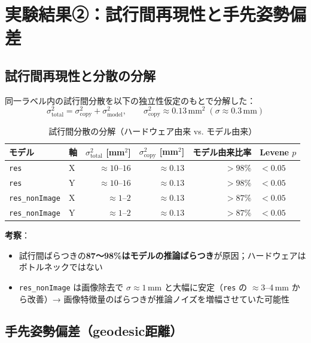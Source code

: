 \documentclass[a4paper,10pt]{jlreq}
\begin{document}
\section{実験結果②：試行間再現性と手先姿勢偏差}

\subsection{試行間再現性と分散の分解}

同一ラベル内の試行間分散を以下の独立性仮定のもとで分解した：
\[
  \sigma^2_\mathrm{total} = \sigma^2_\mathrm{copy} + \sigma^2_\mathrm{model},
  \qquad \sigma^2_\mathrm{copy} \approx 0.13\,\mathrm{mm}^2 \;(\sigma\approx0.3\,\mathrm{mm})
\]

\begin{table}[h]
  \centering\small
  \caption{試行間分散の分解（ハードウェア由来 vs. モデル由来）}
  \begin{tabular}{llrrrl}
    \toprule
    モデル & 軸 & $\sigma^2_\mathrm{total}$ [mm$^2$] & $\sigma^2_\mathrm{copy}$ [mm$^2$] & モデル由来比率 & Levene $p$ \\
    \midrule
    \texttt{res}          & X & $\approx 10$--$16$ & $\approx 0.13$ & $> 98\%$ & $<0.05$ \\
    \texttt{res}          & Y & $\approx 10$--$16$ & $\approx 0.13$ & $> 98\%$ & $<0.05$ \\
    \texttt{res\_nonImage}& X & $\approx 1$--$2$   & $\approx 0.13$ & $> 87\%$ & $<0.05$ \\
    \texttt{res\_nonImage}& Y & $\approx 1$--$2$   & $\approx 0.13$ & $> 87\%$ & $<0.05$ \\
    \bottomrule
  \end{tabular}
\end{table}

\textbf{考察}：
\begin{itemize}
  \item 試行間ばらつきの\textbf{87〜98\%はモデルの推論ばらつき}が原因；ハードウェアはボトルネックではない
  \item \texttt{res\_nonImage} は画像除去で $\sigma\approx1$\,mm と大幅に安定（\texttt{res} の $\approx3$--4\,mm から改善）→ 画像特徴量のばらつきが推論ノイズを増幅させていた可能性
\end{itemize}

\subsection{手先姿勢偏差（geodesic距離）}
\end{document}
